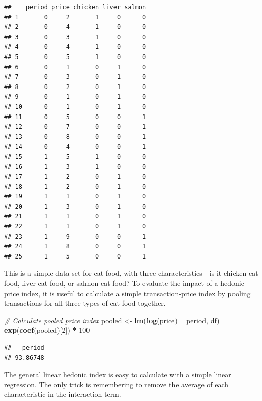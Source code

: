 \documentclass[]{article}
\newenvironment{Shaded}{\begin{snugshade}}{\end{snugshade}}
\newcommand{\CommentTok}[1]{\textcolor[rgb]{0.56,0.35,0.01}{\textit{#1}}}
\newcommand{\DecValTok}[1]{\textcolor[rgb]{0.00,0.00,0.81}{#1}}
\newcommand{\KeywordTok}[1]{\textcolor[rgb]{0.13,0.29,0.53}{\textbf{#1}}}
\newcommand{\NormalTok}[1]{#1}
\newcommand{\OperatorTok}[1]{\textcolor[rgb]{0.81,0.36,0.00}{\textbf{#1}}}
\newcommand{\StringTok}[1]{\textcolor[rgb]{0.31,0.60,0.02}{#1}}
\begin{document}
\begin{verbatim}
##    period price chicken liver salmon
## 1       0     2       1     0      0
## 2       0     4       1     0      0
## 3       0     3       1     0      0
## 4       0     4       1     0      0
## 5       0     5       1     0      0
## 6       0     1       0     1      0
## 7       0     3       0     1      0
## 8       0     2       0     1      0
## 9       0     1       0     1      0
## 10      0     1       0     1      0
## 11      0     5       0     0      1
## 12      0     7       0     0      1
## 13      0     8       0     0      1
## 14      0     4       0     0      1
## 15      1     5       1     0      0
## 16      1     3       1     0      0
## 17      1     2       0     1      0
## 18      1     2       0     1      0
## 19      1     1       0     1      0
## 20      1     3       0     1      0
## 21      1     1       0     1      0
## 22      1     1       0     1      0
## 23      1     9       0     0      1
## 24      1     8       0     0      1
## 25      1     5       0     0      1
\end{verbatim}

This is a simple data set for cat food, with three characteristics---is it chicken cat food, liver cat food, or salmon cat food? To evaluate the impact of a hedonic price index, it is useful to calculate a simple transaction-price index by pooling transactions for all three types of cat food together.

\begin{Shaded}
\begin{Highlighting}[]
\CommentTok{# Calculate pooled price index}
\NormalTok{pooled <-}\StringTok{ }\KeywordTok{lm}\NormalTok{(}\KeywordTok{log}\NormalTok{(price) }\OperatorTok{~}\StringTok{ }\NormalTok{period, df)}
\KeywordTok{exp}\NormalTok{(}\KeywordTok{coef}\NormalTok{(pooled)[}\DecValTok{2}\NormalTok{]) }\OperatorTok{*}\StringTok{ }\DecValTok{100}
\end{Highlighting}
\end{Shaded}

\begin{verbatim}
##   period 
## 93.86748
\end{verbatim}

The general linear hedonic index is easy to calculate with a simple linear regression. The only trick is remembering to remove the average of each characteristic in the interaction term.
\end{document}
